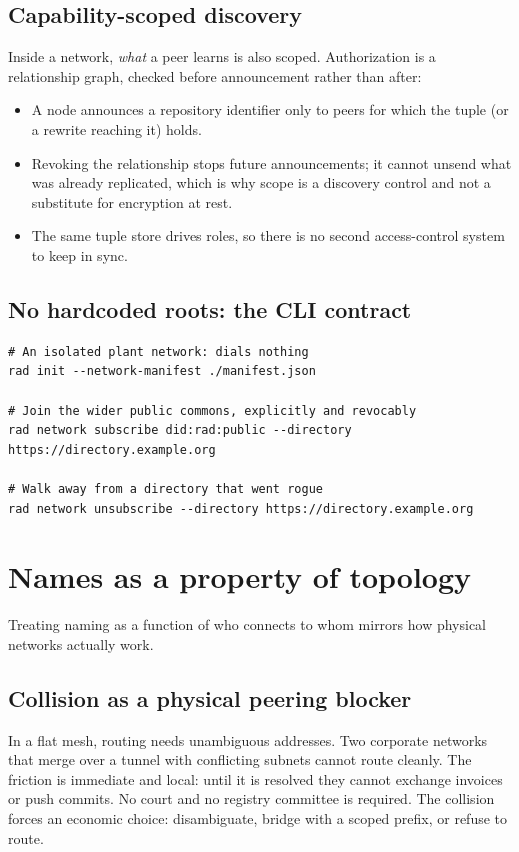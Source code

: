 \documentclass[a4paper,11pt,twoside,parskip=half-,headings=small]{scrartcl}
\begin{document}
\subsection{Capability-scoped discovery}
Inside a network, \emph{what} a peer learns is also scoped. Authorization is a relationship graph,
checked before announcement rather than after:
\begin{itemize}
  \item A node announces a repository identifier only to peers for which the tuple
         (or a rewrite reaching it) holds.
  \item Revoking the relationship stops future announcements; it cannot unsend what was already replicated,
        which is why scope is a discovery control and not a substitute for encryption at rest.
  \item The same tuple store drives roles, so there is no second access-control system to keep in sync.
\end{itemize}

\subsection{No hardcoded roots: the CLI contract}
\begin{lstlisting}[language={},basicstyle=\ttfamily\scriptsize,caption={Proposed operator workflow. The command names are illustrative.}]
# An isolated plant network: dials nothing
rad init --network-manifest ./manifest.json

# Join the wider public commons, explicitly and revocably
rad network subscribe did:rad:public --directory https://directory.example.org

# Walk away from a directory that went rogue
rad network unsubscribe --directory https://directory.example.org
\end{lstlisting}

\section{Names as a property of topology}
\label{sec:names}

Treating naming as a function of who connects to whom mirrors how physical networks actually work.

\subsection{Collision as a physical peering blocker}
In a flat mesh, routing needs unambiguous addresses. Two corporate networks that merge over a
tunnel with conflicting  subnets cannot route cleanly. The friction
is immediate and local: until it is resolved they cannot exchange invoices or push
commits. No court and no registry committee is required. The collision forces an economic choice: disambiguate,
bridge with a scoped prefix, or refuse to route.
\end{document}
